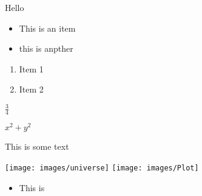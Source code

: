 \documentclass{article}
\begin{document}
Hello

\begin{itemize}
    \item This is an item
    \item this is anpther 
\end{itemize}

\begin{enumerate}
    \item Item 1
    \item Item 2
    
\end{enumerate}

$\frac{3}{4}$


$x^2+y^2$


This is some text~\cite{knuth:1984}



\texttt{[image: images/universe]}
\texttt{[image: images/Plot]}



\begin{itemize}
    \item This is
\end{itemize}
\end{document}
